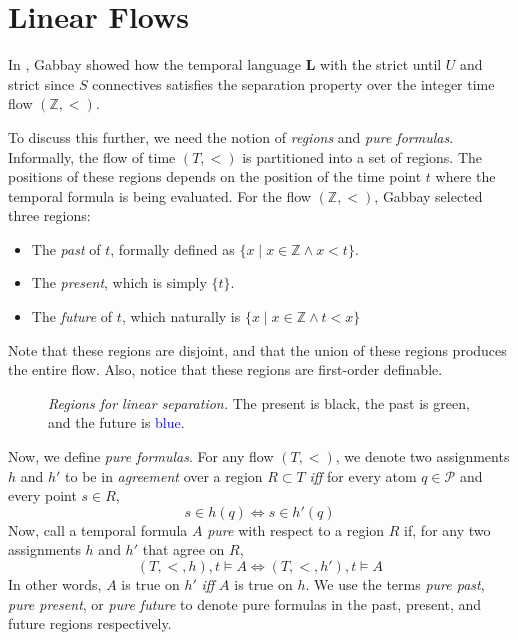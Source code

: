 \documentclass[a4paper,UKenglish,cleveref, autoref, thm-restate, numberwithinsect]{lipics-v2021}
\begin{document}
\section{Linear Flows}
\label{sec:linear-time}

In \cite{gabbay1994}, Gabbay showed how the temporal language $\mathbf{L}$ with the \textsf{strict until} $U$ and \textsf{strict since} $S$ connectives satisfies the separation property over the integer time flow $(\mathbb{Z}, <)$.

To discuss this further, we need the notion of \textit{regions} and \textit{pure formulas}. Informally, the flow of time $(T, <)$ is partitioned into a set of regions. The positions of these regions depends on the position of the time point $t$ where the temporal formula is being evaluated. For the flow $(\mathbb{Z}, <)$, Gabbay selected three regions:
\begin{itemize}
    \item The \textit{past} of $t$, formally defined as $\{ x \mid x \in \mathbb{Z} \land x < t\}$.
    \item The \textit{present}, which is simply $\{ t \}$.
    \item The \textit{future} of $t$, which naturally is $\{x \mid x \in \mathbb{Z} \land t < x\}$
\end{itemize}
Note that these regions are disjoint, and that the union of these regions produces the entire flow. Also, notice that these regions are first-order definable.

\begin{figure}
    \centering
    \caption[]{\emph{Regions for linear separation.} The present is black, the past is \textcolor{OliveGreen}{green}, and the future is \textcolor{blue}{blue}.}
    \label{fig:linear-separation-regions}
\end{figure}

Now, we define \textit{pure formulas}. For any flow $(T, <)$, we denote two assignments $h$ and $h'$ to be in \textit{agreement} over a region $R \subset T$ \textit{iff} for every atom $q \in \mathcal{P}$ and every point $s \in R$,
\begin{equation*}
    s \in h(q) \Longleftrightarrow s \in h'(q)
\end{equation*}
Now, call a temporal formula $A$ \textit{pure} with respect to a region $R$ if, for any two assignments $h$ and $h'$ that agree on $R$,
\begin{equation*}
    (T, <, h), t \vDash A \Longleftrightarrow (T, <, h'), t \vDash A
\end{equation*}
In other words, $A$ is true on $h'$ \textit{iff} $A$ is true on $h$. We use the terms \textit{pure past}, \textit{pure present}, or \textit{pure future} to denote pure formulas in the past, present, and future regions respectively.
\end{document}
